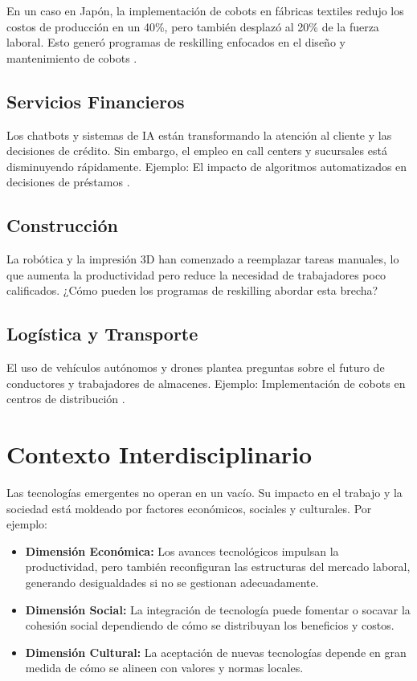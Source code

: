 \begin{refsection}
En un caso en Japón, la implementación de cobots en fábricas textiles redujo los costos de producción en un 40\%, pero también desplazó al 20\% de la fuerza laboral. Esto generó programas de reskilling enfocados en el diseño y mantenimiento de cobots \cite{WOS:000668201400001}.

\subsection{Servicios Financieros}
Los chatbots y sistemas de IA están transformando la atención al cliente y las decisiones de crédito. Sin embargo, el empleo en call centers y sucursales está disminuyendo rápidamente. Ejemplo: El impacto de algoritmos automatizados en decisiones de préstamos \cite{WOS:001035901600001}.

\subsection{Construcción}
La robótica y la impresión 3D han comenzado a reemplazar tareas manuales, lo que aumenta la productividad pero reduce la necesidad de trabajadores poco calificados. ¿Cómo pueden los programas de reskilling abordar esta brecha?

\subsection{Logística y Transporte}
El uso de vehículos autónomos y drones plantea preguntas sobre el futuro de conductores y trabajadores de almacenes. Ejemplo: Implementación de cobots en centros de distribución \cite{WOS:000668201400001}.



\section{Contexto Interdisciplinario}
Las tecnologías emergentes no operan en un vacío. Su impacto en el trabajo y la sociedad está moldeado por factores económicos, sociales y culturales. Por ejemplo:
\begin{itemize}
    \item \textbf{Dimensión Económica:} Los avances tecnológicos impulsan la productividad, pero también reconfiguran las estructuras del mercado laboral, generando desigualdades si no se gestionan adecuadamente.
    \item \textbf{Dimensión Social:} La integración de tecnología puede fomentar o socavar la cohesión social dependiendo de cómo se distribuyan los beneficios y costos.
    \item \textbf{Dimensión Cultural:} La aceptación de nuevas tecnologías depende en gran medida de cómo se alineen con valores y normas locales.
\end{itemize}



\end{refsection}
